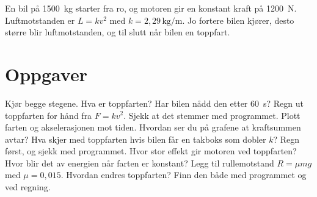 \documentclass[11pt]{article}
\begin{document}

En bil på 1500~kg starter fra ro, og motoren gir en konstant kraft på 1200~N. Luftmotstanden er $L = kv^{2}$ med $k = 2{,}29\,\mathrm{kg/m}$. Jo fortere bilen kjører, desto større blir luftmotstanden, og til slutt når bilen en toppfart.

\section*{Oppgaver}

\begin{oppgaveliste}
\oppgave {}Kjør begge stegene. Hva er toppfarten? Har bilen nådd den etter 60~s?
\svar
\oppgave {}Regn ut toppfarten for hånd fra $F = kv^{2}$. Sjekk at det stemmer med programmet.
\svar
\oppgave {}Plott farten og akselerasjonen mot tiden. Hvordan ser du på grafene at kraftsummen avtar?
\svar
\oppgave {}Hva skjer med toppfarten hvis bilen får en takboks som dobler $k$? Regn først, og sjekk med programmet.
\svar
\oppgave {}Hvor stor effekt gir motoren ved toppfarten? Hvor blir det av energien når farten er konstant?
\svar
\oppgave {}Legg til rullemotstand $R = μmg$ med $μ = 0{,}015$. Hvordan endres toppfarten? Finn den både med programmet og ved regning.
\svar
\end{oppgaveliste}
\end{document}
